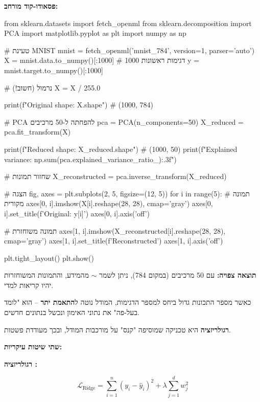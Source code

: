 \textbf{פסאודו-קוד מורחב:}

\begin{pythonbox}
from sklearn.datasets import fetch_openml
from sklearn.decomposition import PCA
import matplotlib.pyplot as plt
import numpy as np

# טעינת MNIST
mnist = fetch_openml('mnist_784', version=1, parser='auto')
X = mnist.data.to_numpy()[:1000]  # 1000 דגימות ראשונות
y = mnist.target.to_numpy()[:1000]

# נרמול (חשוב!)
X = X / 255.0

print(f"Original shape: {X.shape}")  # (1000, 784)

# PCA להפחתה ל-50 מרכיבים
pca = PCA(n_components=50)
X_reduced = pca.fit_transform(X)

print(f"Reduced shape: {X_reduced.shape}")  # (1000, 50)
print(f"Explained variance: {np.sum(pca.explained_variance_ratio_):.3f}")

# שחזור תמונות
X_reconstructed = pca.inverse_transform(X_reduced)

# הצגה
fig, axes = plt.subplots(2, 5, figsize=(12, 5))
for i in range(5):
    # תמונה מקורית
    axes[0, i].imshow(X[i].reshape(28, 28), cmap='gray')
    axes[0, i].set_title(f'Original: {y[i]}')
    axes[0, i].axis('off')
    
    # תמונה משוחזרת
    axes[1, i].imshow(X_reconstructed[i].reshape(28, 28), cmap='gray')
    axes[1, i].set_title(f'Reconstructed')
    axes[1, i].axis('off')

plt.tight_layout()
plt.show()
\end{pythonbox}

\textbf{תוצאה צפויה:} עם \num{50} מרכיבים (במקום \num{784}), ניתן לשמר $\sim$ מהמידע, והתמונות המשוחזרות יהיו קריאות למדי.


כאשר מספר התכונות גדול ביחס למספר הדגימות, המודל נוטה ל\textbf{התאמת יתר}  – הוא "לומד בעל-פה" את נתוני האימון ונכשל בנתונים חדשים.

\textbf{רגולריזציה}  היא טכניקה שמוסיפה "קנס" על מורכבות המודל, ובכך מעודדת פשטות.

\textbf{שתי שיטות עיקריות:}

\textbf{רגולריזציה :}

\begin{equation}
\mathcal{L}_{\text{Ridge}} = \sum_{i=1}^{n} (y_i - \hat{y}_i)^2 + \lambda \sum_{j=1}^{d} w_j^2
\end{equation}


